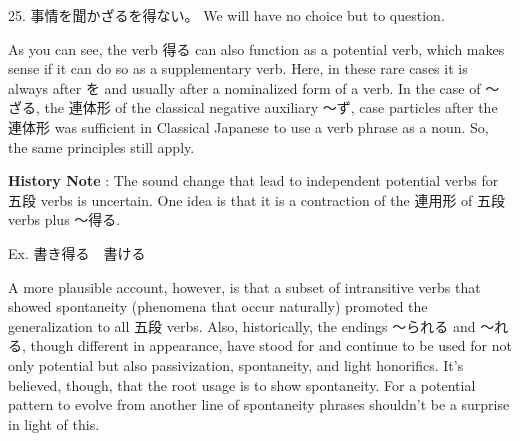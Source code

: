 \par{25. 事情を聞かざるを得ない。 \hfill\break
We will have no choice but to question. }

\par{ As you can see, the verb 得る can also function as a potential verb, which makes sense if it can do so as a supplementary verb. Here, in these rare cases it is always after を and usually after a nominalized form of a verb. In the case of ～ざる, the 連体形 of the classical negative auxiliary ～ず, case particles after the 連体形 was sufficient in Classical Japanese to use a verb phrase as a noun. So, the same principles still apply. }

\par{\textbf{History Note }: The sound change that lead to independent potential verbs for 五段 verbs is uncertain. One idea is that it is a contraction of the 連用形 of 五段 verbs plus ～得る. }

\par{Ex. 書き得る　\textrightarrow  書ける }

\par{ A more plausible account, however, is that a subset of intransitive verbs that showed spontaneity (phenomena that occur naturally) promoted the generalization to all 五段 verbs. Also, historically, the endings ～られる and ～れる, though different in appearance, have stood for and continue to be used for not only potential but also passivization, spontaneity, and light honorifics. It's believed, though, that the root usage is to show spontaneity. For a potential pattern to evolve from another line of spontaneity phrases shouldn't be a surprise in light of this. }
    